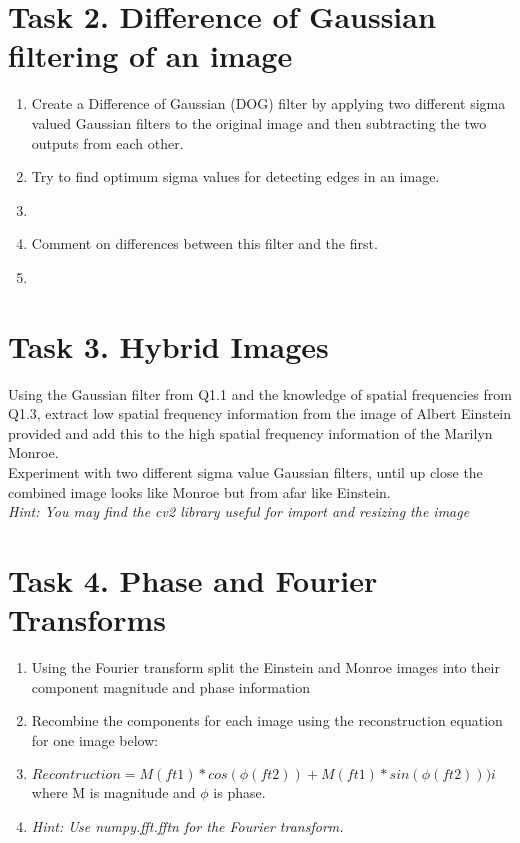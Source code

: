 \documentclass[12pt,english]{scrartcl}
\begin{document}
\section*{Task 2. Difference of Gaussian filtering of an image}

\begin{enumerate}
 \color{black}
 \item Create a Difference of Gaussian (DOG) filter by applying two different sigma valued Gaussian  filters to the original image and then subtracting the two outputs from each other. \\ 

 \color{black}
 \item Try to find optimum sigma values for detecting edges in an image. \\
 \item[]

 \color{black}
 \item Comment on differences between this filter and the first. \\
 \item[]

\end{enumerate}

\section*{Task 3. Hybrid Images}
Using the Gaussian filter from Q1.1 and the knowledge of spatial frequencies from Q1.3, extract low spatial frequency information from the image of Albert Einstein provided and add this to the high spatial frequency information of the Marilyn Monroe. \\

Experiment with two different sigma value Gaussian filters, until up close the combined image looks like Monroe but from afar like Einstein. \\

\textit{Hint: You may find the cv2 library useful for import and resizing the image} \\

\section*{Task 4. Phase and Fourier Transforms}
\begin{enumerate}

\item Using the Fourier transform split the Einstein and Monroe images into their component magnitude and phase information  \\

\item Recombine the components for each image using the reconstruction equation for one image below: \\
\item[]
$Recontruction = M(ft1)*cos(\phi(ft2)) + M(ft1)*sin(\phi(ft2))) i$ \\
where M is magnitude and $\phi$ is phase.
\item[]
\textit{Hint: Use numpy.fft.fftn for the Fourier transform.}
\end{enumerate}
\end{document}
